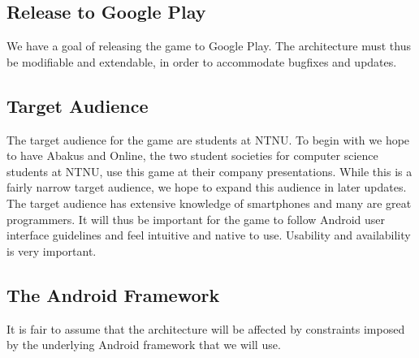 \subsection{Release to Google Play}
We have a goal of releasing the game to Google Play. The architecture must thus
be modifiable and extendable, in order to accommodate bugfixes and updates.

\subsection{Target Audience}
The target audience for the game are students at NTNU\@. To begin with we hope
to have Abakus and Online, the two student societies for computer science
students at NTNU, use this game at their company presentations. While this is a
fairly narrow target audience, we hope to expand this audience in later updates.
The target audience has extensive knowledge of smartphones and many are great
programmers. It will thus be important for the game to follow Android user
interface guidelines and feel intuitive and native to use. Usability and
availability is very important.

\subsection{The Android Framework}
It is fair to assume that the architecture will be affected by constraints
imposed by the underlying Android framework that we will use.
